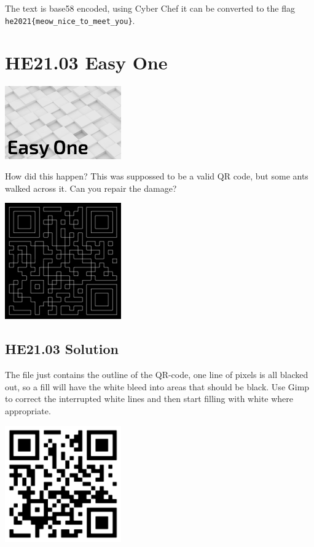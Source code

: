 \documentclass[english,a4paper,nols,noindent]{tufte-handout}
\begin{document}
The text is base58 encoded, using Cyber Chef it can be converted to
the flag \verb+he2021{meow_nice_to_meet_you}+.

\hypertarget{he21.03}{%
\section{HE21.03 Easy One}\label{he21.03}}

\begin{marginfigure}
    \includegraphics[width=50mm]{images/challenge3.jpg}
\end{marginfigure}

\noindent How did this happen? This was suppossed to be a
valid QR code, but some ants walked across it. Can you repair the
damage?

\begin{marginfigure}
    \includegraphics[width=50mm]{ch03/easyone.png}
\end{marginfigure}

\hypertarget{he21.03-solution}{%
\subsection{HE21.03 Solution}\label{he21.03-solution}}

\noindent The file just contains the outline of the QR-code, one line
of pixels is all blacked out, so a fill will have the white bleed into
areas that should be black.  Use Gimp to correct the interrupted white
lines and then start filling with white where appropriate.

\begin{marginfigure}
    \includegraphics[width=50mm]{ch03/easyone_solved.png}
\end{marginfigure}
\end{document}
